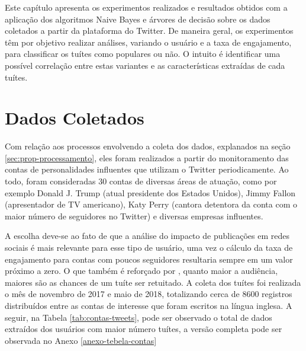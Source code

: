 \documentclass[oneside,openright,12pt]{ufsm_2015} %
\begin{document}
    \par Este capítulo apresenta os experimentos realizados e resultados obtidos com a aplicação dos algoritmos Naive Bayes e árvores de decisão sobre os dados coletados a partir da plataforma do Twitter. De maneira geral, os experimentos têm por objetivo realizar análises, variando o usuário e a taxa de engajamento, para classificar os tuítes como populares ou não. O intuito é identificar uma possível correlação entre estas variantes e as características extraídas de cada tuítes.


\section{Dados Coletados}
\label{sec:exp-dados-coletados}

    \par Com relação aos processos envolvendo a coleta dos dados, explanados na seção \ref{sec:prop-processamento}, eles foram realizados a partir do monitoramento das contas de personalidades influentes que utilizam o Twitter periodicamente. Ao todo, foram consideradas 30 contas de diversas áreas de atuação, como por exemplo Donald J. Trump (atual presidente dos Estados Unidos), Jimmy Fallon (apresentador de TV americano), Katy Perry (cantora detentora da conta com o maior número de seguidores no Twitter) e diversas empresas influentes.
    
    \par A escolha deve-se ao fato de que a análise do impacto de publicações em redes sociais é mais relevante para esse tipo de usuário, uma vez o cálculo da taxa de engajamento para contas com poucos seguidores resultaria sempre em um valor próximo a zero. O que também é reforçado por \cite{ieee:suh:10}, quanto maior a audiência, maiores são as chances de um tuíte ser retuitado. A coleta dos tuítes foi realizada o mês de novembro de 2017 e maio de 2018, totalizando cerca de 8600 registros distribuídos entre as contas de interesse que foram escritos na língua inglesa. A seguir, na Tabela \ref{tab:contas-tweets}, pode ser observado o total de dados extraídos dos usuários com maior número tuítes, a versão completa pode ser observada no Anexo \ref{anexo-tebela-contas}
    
\end{document}
